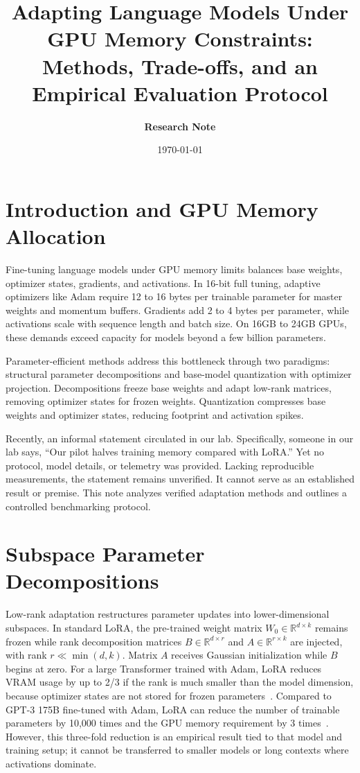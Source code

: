 \documentclass[11pt,a4paper]{article}
\title{\textbf{Adapting Language Models Under GPU Memory Constraints:\\
Methods, Trade-offs, and an Empirical Evaluation Protocol}}
\author{\textbf{Research Note}}
\date{\today}
\begin{document}
\maketitle

\section{Introduction and GPU Memory Allocation}
Fine-tuning language models under GPU memory limits balances base weights, optimizer states, gradients, and activations. In 16-bit full tuning, adaptive optimizers like Adam require 12 to 16 bytes per trainable parameter for master weights and momentum buffers. Gradients add 2 to 4 bytes per parameter, while activations scale with sequence length and batch size. On 16GB to 24GB GPUs, these demands exceed capacity for models beyond a few billion parameters.

Parameter-efficient methods address this bottleneck through two paradigms: structural parameter decompositions and base-model quantization with optimizer projection. Decompositions freeze base weights and adapt low-rank matrices, removing optimizer states for frozen weights. Quantization compresses base weights and optimizer states, reducing footprint and activation spikes.

Recently, an informal statement circulated in our lab. Specifically, someone in our lab says, ``Our pilot halves training memory compared with LoRA.'' Yet no protocol, model details, or telemetry was provided. Lacking reproducible measurements, the statement remains unverified. It cannot serve as an established result or premise. This note analyzes verified adaptation methods and outlines a controlled benchmarking protocol.

\section{Subspace Parameter Decompositions}
Low-rank adaptation restructures parameter updates into lower-dimensional subspaces. In standard LoRA, the pre-trained weight matrix $W_0 \in \mathbb{R}^{d \times k}$ remains frozen while rank decomposition matrices $B \in \mathbb{R}^{d \times r}$ and $A \in \mathbb{R}^{r \times k}$ are injected, with rank $r \ll \min(d, k)$. Matrix $A$ receives Gaussian initialization while $B$ begins at zero. For a large Transformer trained with Adam, LoRA reduces VRAM usage by up to 2/3 if the rank is much smaller than the model dimension, because optimizer states are not stored for frozen parameters~\cite{hu2021lora}. Compared to GPT-3 175B fine-tuned with Adam, LoRA can reduce the number of trainable parameters by 10,000 times and the GPU memory requirement by 3 times~\cite{hu2021lora}. However, this three-fold reduction is an empirical result tied to that model and training setup; it cannot be transferred to smaller models or long contexts where activations dominate.
\end{document}
